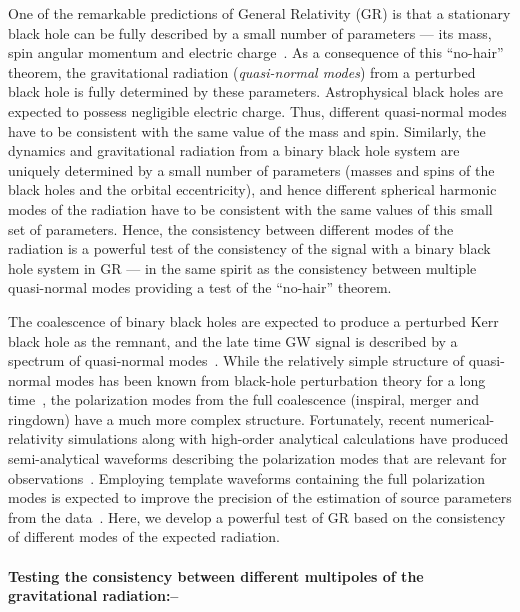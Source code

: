 \documentclass[prl,preprintnumbers,twocolumn,eqsecnum,floatfix,a4paper,nofootinbib,superscriptaddress]{revtex4}
\begin{document}
One of the remarkable predictions of General Relativity (GR) is that a stationary black hole can be fully described by a small number of parameters --- its mass, spin angular momentum and electric charge~\cite{uniqueness-theorems}. As a consequence of this ``no-hair'' theorem, the gravitational radiation (\emph{quasi-normal modes}) from a perturbed black hole is fully determined by these parameters. Astrophysical black holes are expected to possess negligible electric charge. Thus, different quasi-normal modes have to be consistent with the same value of the mass and spin. Similarly, the dynamics and gravitational radiation from a binary black hole system are uniquely determined by a small number of parameters (masses and spins of the black holes and the orbital eccentricity), and hence different spherical harmonic modes of the radiation have to be consistent with the same values of this small set of parameters. Hence, the consistency between different modes of the radiation is a powerful test of the consistency of the signal with a binary black hole system in GR --- in the same spirit as the consistency between multiple quasi-normal modes providing a test of the ``no-hair'' theorem. 

The coalescence of binary black holes are expected to produce a perturbed Kerr black hole as the remnant, and the late time GW signal is described by a spectrum of quasi-normal modes~\cite{xxx}. While the relatively simple structure of quasi-normal modes has been known from black-hole perturbation theory for a long time~\cite{bhp-review}, the polarization modes from the full coalescence (inspiral, merger and ringdown) have a much more complex structure. Fortunately, recent numerical-relativity simulations along with high-order analytical calculations have produced semi-analytical waveforms describing the polarization modes that are relevant for observations~\cite{eobnr,phenom,refs,Mehta:2017jpq}. Employing template waveforms containing the full polarization modes is expected to improve the precision of the estimation of source parameters from the data~\cite{xx}. Here, we develop a powerful test of GR based on the consistency of different modes of the expected radiation.  

\paragraph{Testing the consistency between different multipoles of the gravitational radiation:--}
\end{document}
